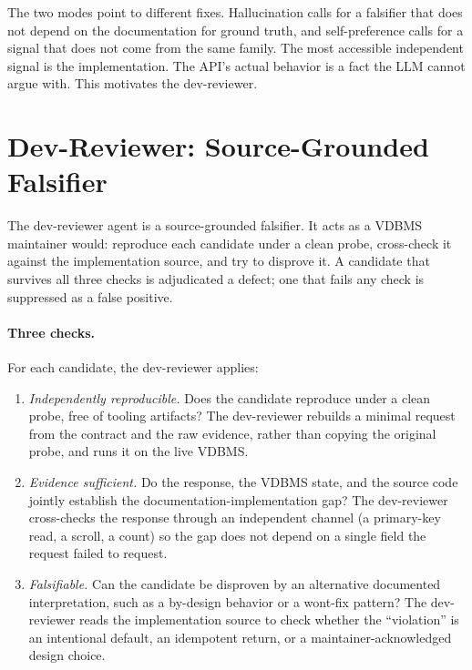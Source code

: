 \documentclass[sigconf]{acmart}
\begin{document}
The two modes point to different fixes. Hallucination calls for a falsifier that does not depend on the documentation for ground truth, and self-preference calls for a signal that does not come from the same family. The most accessible independent signal is the implementation. The API's actual behavior is a fact the LLM cannot argue with. This motivates the dev-reviewer.

\section{Dev-Reviewer: Source-Grounded Falsifier}
\label{sec:devreviewer}

The dev-reviewer agent is a source-grounded falsifier. It acts as a VDBMS maintainer would: reproduce each candidate under a clean probe, cross-check it against the implementation source, and try to disprove it. A candidate that survives all three checks is adjudicated a defect; one that fails any check is suppressed as a false positive.

\paragraph{Three checks.}
For each candidate, the dev-reviewer applies:
\begin{enumerate}
  \item \emph{Independently reproducible.} Does the candidate reproduce under a clean probe, free of tooling artifacts? The dev-reviewer rebuilds a minimal request from the contract and the raw evidence, rather than copying the original probe, and runs it on the live VDBMS.
  \item \emph{Evidence sufficient.} Do the response, the VDBMS state, and the source code jointly establish the documentation-implementation gap? The dev-reviewer cross-checks the response through an independent channel (a primary-key read, a scroll, a count) so the gap does not depend on a single field the request failed to request.
  \item \emph{Falsifiable.} Can the candidate be disproven by an alternative documented interpretation, such as a by-design behavior or a wont-fix pattern? The dev-reviewer reads the implementation source to check whether the ``violation'' is an intentional default, an idempotent return, or a maintainer-acknowledged design choice.
\end{enumerate}
\end{document}
